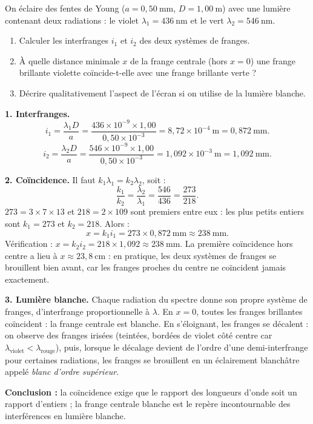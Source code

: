 \documentclass[11pt]{article}
\newcommand{\cle}[1]{{\popxbold\color{popdark}#1}}
\begin{document}
\begin{exoresolu}
On éclaire des fentes de Young ($a = 0,50\ \text{mm}$, $D = 1,00\ \text{m}$) avec une lumière contenant deux radiations : le violet $\lambda_1 = 436\ \text{nm}$ et le vert $\lambda_2 = 546\ \text{nm}$.
\begin{enumerate}
\item Calculer les interfranges $i_1$ et $i_2$ des deux systèmes de franges.
\item À quelle distance minimale $x$ de la frange centrale (hors $x = 0$) une frange brillante violette coïncide-t-elle avec une frange brillante verte ?
\item Décrire qualitativement l'aspect de l'écran si on utilise de la lumière blanche.
\end{enumerate}
\tcblower
\textbf{1. Interfranges.}
\[ i_1 = \frac{\lambda_1 D}{a} = \frac{436\times 10^{-9} \times 1,00}{0,50\times 10^{-3}} = 8,72\times 10^{-4}\ \text{m} = 0,872\ \text{mm}. \]
\[ i_2 = \frac{\lambda_2 D}{a} = \frac{546\times 10^{-9} \times 1,00}{0,50\times 10^{-3}} = 1,092\times 10^{-3}\ \text{m} = 1,092\ \text{mm}. \]

\textbf{2. Coïncidence.} Il faut $k_1\lambda_1 = k_2\lambda_2$, soit :
\[ \frac{k_1}{k_2} = \frac{\lambda_2}{\lambda_1} = \frac{546}{436} = \frac{273}{218}. \]
$273 = 3\times 7\times 13$ et $218 = 2\times 109$ sont premiers entre eux : les plus petits entiers sont $k_1 = 273$ et $k_2 = 218$. Alors :
\[ x = k_1 i_1 = 273 \times 0,872\ \text{mm} \approx 238\ \text{mm}. \]
Vérification : $x = k_2 i_2 = 218 \times 1,092 \approx 238\ \text{mm}$. La première coïncidence hors centre a lieu à $x \approx 23,8\ \text{cm}$ : en pratique, les deux systèmes de franges se brouillent bien avant, car les franges proches du centre ne coïncident jamais exactement.

\textbf{3. Lumière blanche.} Chaque radiation du spectre donne son propre système de franges, d'interfrange proportionnelle à $\lambda$. En $x = 0$, toutes les franges brillantes coïncident : la \cle{frange centrale est blanche}. En s'éloignant, les franges se décalent : on observe des franges \cle{irisées} (teintées, bordées de violet côté centre car $\lambda_{\text{violet}} < \lambda_{\text{rouge}}$), puis, lorsque le décalage devient de l'ordre d'une demi-interfrange pour certaines radiations, les franges se brouillent en un éclairement blanchâtre appelé \emph{blanc d'ordre supérieur}.

\textbf{Conclusion :} la coïncidence exige que le rapport des longueurs d'onde soit un rapport d'entiers ; la frange centrale blanche est le repère incontournable des interférences en lumière blanche.
\end{exoresolu}
\end{document}

